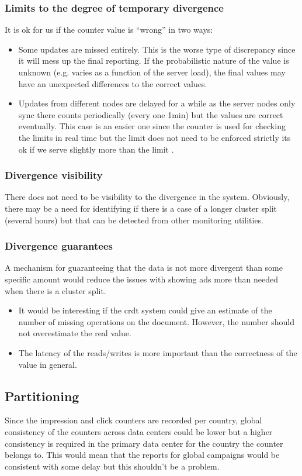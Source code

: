\documentclass[11pt,a4paper]{report}
\begin{document}
\subsubsection{Limits to the degree of temporary divergence}
It is ok for us if the counter value is ``wrong'' in two ways:
\begin{itemize}
\item Some updates are missed entirely. This is the worse type of discrepancy since it will mess up the final reporting. If the probabilistic nature of the value is unknown (e.g. varies as a function of the server load), the final values may have an unexpected differences to the correct values.
\item Updates from different nodes are delayed  for a while as the server nodes only sync there counts periodically (every one 1min) but the values are correct eventually. This case is an easier one since the counter is used for checking the limits in real time but the limit does not need to be enforced strictly its ok if we serve slightly more than the limit .
\end{itemize}

\subsubsection{Divergence visibility}
There does not need to be visibility to the divergence in the system. Obviously, there may be a need for identifying if there is a case of a longer cluster split (several hours) but that can be detected from other monitoring utilities.

\subsubsection{Divergence guarantees}
A mechanism for guaranteeing that the data is not more divergent than some specific amount would reduce the issues with showing ads more than needed when there is a cluster split.

\begin{itemize}
\item It would be interesting if the \gls{crdt} system could give an estimate of the number of missing operations on the document. However, the number should not overestimate the real value.
\item The latency of the reads/writes is more important than the correctness of the value in general.
\end{itemize}

\subsection{Partitioning}
Since the impression and click counters are recorded per country, global consistency of the counters across data centers could be lower but a  higher consistency is required in the primary data center for the country the counter belongs to. This would mean that the reports for global campaigns would be consistent with some delay but this shouldn't be a problem.
\end{document}
